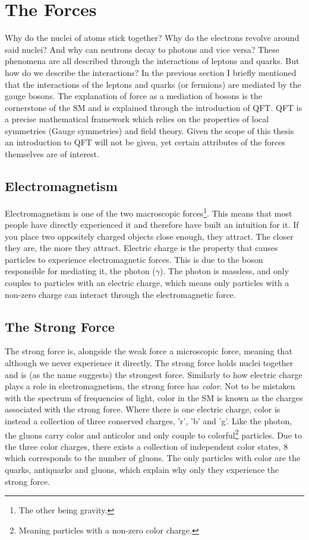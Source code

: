 \section{The Forces}
Why do the nuclei of atoms stick together? Why do the electrons revolve
around said nuclei? And why can neutrons decay to photons and vice versa? These phenomena 
are all described through the interactions of leptons and quarks. But how do we describe the 
interactions? In the previous section I briefly mentioned that the interactions of the leptons 
and quarks (or fermions) are mediated by the gauge bosons. The explanation of force as 
a mediation of bosons is the cornerstone of the \ac{SM} and is explained through 
the introduction of \ac{QFT}. \ac{QFT} is a precise mathematical framework which relies on the 
properties of local symmetries (Gauge symmetries) and field theory. Given the scope of this thesis
an introduction to \ac{QFT} will not be given, yet certain attributes of the forces themselves
are of interest. 
\subsection{Electromagnetism}
Electromagnetism is one of the two macroscopic forces\footnote{The other being gravity.}.
This means that most people have directly experienced it and therefore have built an intuition for
it. If you place two oppositely charged objects close enough, they attract. The closer they are, 
the more they attract. Electric charge is the property that causes particles to 
experience electromagnetic forces. This is due to the boson responsible for mediating it, 
the photon ($\gamma$). The photon is massless, and only couples to particles with an electric charge,
which means only particles with a non-zero charge can interact through the electromagnetic force.
\subsection{The Strong Force}
The strong force is, alongside the weak force a microscopic force, meaning that although 
we never experience it directly. The strong force 
holds nuclei together and is (as the name suggests) the strongest force. Similarly to how electric 
charge plays a role in electromagnetism, the strong force has \emph{color}. Not to be mistaken 
with the spectrum of frequencies of light, color in the \ac{SM} is known as the charges 
associated with the strong force. Where there is one electric charge, color is instead a collection 
of three conserved charges, 'r', 'b' and 'g'. Like the photon, the gluons carry color and anticolor
and only couple to colorful\footnote{Meaning particles with a non-zero color charge.} particles. 
Due to the three color charges, there exists a collection of independent color states, 8 which 
corresponds to the number of gluons. The only particles with color are the quarks, antiquarks and gluons, which explain why 
only they experience the strong force. 

